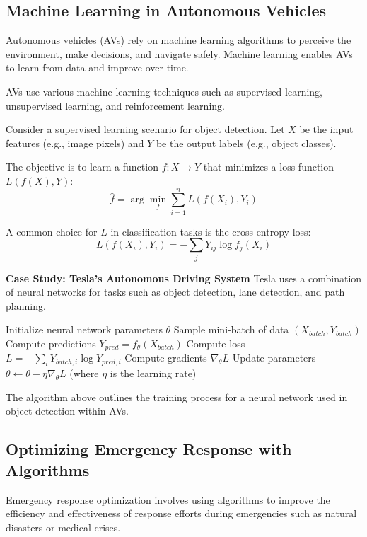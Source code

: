 \documentclass[12pt]{book} %
\begin{document}
\subsection{Machine Learning in Autonomous Vehicles}
Autonomous vehicles (AVs) rely on machine learning algorithms to perceive the environment, make decisions, and navigate safely. Machine learning enables AVs to learn from data and improve over time.

AVs use various machine learning techniques such as supervised learning, unsupervised learning, and reinforcement learning.

Consider a supervised learning scenario for object detection. Let $X$ be the input features (e.g., image pixels) and $Y$ be the output labels (e.g., object classes).

The objective is to learn a function $f: X \rightarrow Y$ that minimizes a loss function $L(f(X), Y)$:
\[
\hat{f} = \arg\min_{f} \sum_{i=1}^{n} L(f(X_i), Y_i)
\]

A common choice for $L$ in classification tasks is the cross-entropy loss:
\[
L(f(X_i), Y_i) = -\sum_{j} Y_{ij} \log f_j(X_i)
\]

\textbf{Case Study: Tesla's Autonomous Driving System}
Tesla uses a combination of neural networks for tasks such as object detection, lane detection, and path planning.
\FloatBarrier
\begin{algorithm}
\caption{Neural Network Training for Object Detection}
\begin{algorithmic}[1]
\State Initialize neural network parameters $\theta$
    \State Sample mini-batch of data $(X_{batch}, Y_{batch})$
    \State Compute predictions $Y_{pred} = f_\theta(X_{batch})$
    \State Compute loss $L = -\sum_{i} Y_{batch,i} \log Y_{pred,i}$
    \State Compute gradients $\nabla_\theta L$
    \State Update parameters $\theta \gets \theta - \eta \nabla_\theta L$ (where $\eta$ is the learning rate)
\EndWhile
\end{algorithmic}
\end{algorithm}
\FloatBarrier

The algorithm above outlines the training process for a neural network used in object detection within AVs.

\subsection{Optimizing Emergency Response with Algorithms}
Emergency response optimization involves using algorithms to improve the efficiency and effectiveness of response efforts during emergencies such as natural disasters or medical crises.
\end{document}

